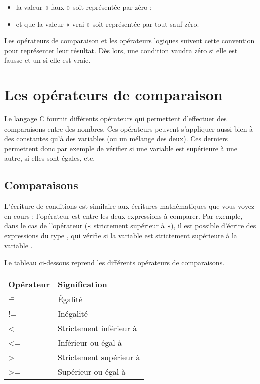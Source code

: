 \begin{itemize}
\item
  la valeur « faux » soit représentée par zéro ;
\item
  et que la valeur « vrai » soit représentée par tout sauf zéro.
\end{itemize}

Les opérateurs de comparaison et les opérateurs logiques suivent cette
convention pour représenter leur résultat. Dès lors, une condition
vaudra zéro si elle est fausse et un si elle est vraie.

\section{Les opérateurs de comparaison}
\label{les-operateurs-de-comparaison}

  Le langage C fournit différents opérateurs qui permettent
  d'effectuer des comparaisons entre des nombres. Ces opérateurs peuvent
  s'appliquer aussi bien à des constantes qu'à des variables (ou un
  mélange des deux). Ces derniers permettent donc par exemple de
  vérifier si une variable est supérieure à une autre, si elles sont
  égales, etc.

\subsection{Comparaisons}
\label{comparaisons}

L'écriture de conditions est similaire aux écritures mathématiques que
vous voyez en cours : l'opérateur est entre les deux expressions à
comparer. Par exemple, dans le cas de l'opérateur
\mybox{\textgreater{}} (« strictement supérieur à »), il est possible
d'écrire des expressions du type , qui
vérifie si la variable  est strictement supérieure à la
variable .

Le tableau ci-dessous reprend les différents opérateurs de comparaisons.

\begin{table}[ht!]
\centering
\begin{tabular}{|l|l|}\hline
\rowcolor{gris-tab-entete}\textbf{Opérateur} & \textbf{Signification}\tabularnewline\hline
\rowcolor{gris-clair-tab}\== & Égalité\tabularnewline\hline
!= & Inégalité\tabularnewline\hline
\rowcolor{gris-clair-tab}\textless{} & Strictement inférieur à\tabularnewline\hline
\textless{}= & Inférieur ou égal à\tabularnewline\hline
\rowcolor{gris-clair-tab}\textgreater{} & Strictement supérieur à\tabularnewline\hline
\textgreater{}= & Supérieur ou égal à\tabularnewline\hline
\end{tabular}
\end{table}

